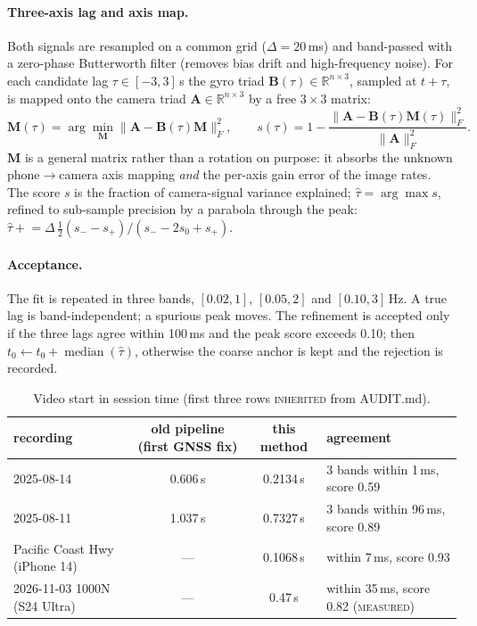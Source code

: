 \documentclass[10pt,a4paper]{article}
\newcommand{\meas}{\textsc{measured}}
\newcommand{\inh}{\textsc{inherited}}
\newcommand{\R}{\mathbb{R}}
\begin{document}
\paragraph{Three-axis lag and axis map.} Both signals are resampled on a common grid ($\Delta = 20$\,ms) and
band-passed with a zero-phase Butterworth filter (removes bias drift and high-frequency noise). For each
candidate lag $\tau \in [-3, 3]$\,s the gyro triad $\mathbf{B}(\tau) \in \R^{n\times3}$, sampled at
$t+\tau$, is mapped onto the camera triad $\mathbf{A} \in \R^{n\times3}$ by a free $3\times3$ matrix:
\begin{equation}
\mathbf{M}(\tau) = \arg\min_{\mathbf{M}} \|\mathbf{A} - \mathbf{B}(\tau)\mathbf{M}\|_F^2, \qquad
s(\tau) = 1 - \frac{\|\mathbf{A} - \mathbf{B}(\tau)\mathbf{M}(\tau)\|_F^2}{\|\mathbf{A}\|_F^2}.
\end{equation}
$\mathbf{M}$ is a general matrix rather than a rotation on purpose: it absorbs the unknown phone$\to$camera
axis mapping \emph{and} the per-axis gain error of the image rates. The score $s$ is the fraction of
camera-signal variance explained; $\hat\tau = \arg\max s$, refined to sub-sample precision by a parabola
through the peak: $\hat\tau \mathrel{+}= \Delta\,\tfrac12 (s_{-} - s_{+})/(s_{-} - 2s_0 + s_{+})$.

\paragraph{Acceptance.} The fit is repeated in three bands, $[0.02,1]$, $[0.05,2]$ and $[0.10,3]$\,Hz. A true
lag is band-independent; a spurious peak moves. The refinement is accepted only if the three lags agree
within 100\,ms and the peak score exceeds 0.10; then $t_0 \leftarrow t_0 + \operatorname{median}(\hat\tau)$,
otherwise the coarse anchor is kept and the rejection is recorded.

\begin{table}[H]
\centering\small
\begin{tabular}{@{}lccl@{}}
\toprule
recording & old pipeline (first GNSS fix) & this method & agreement \\
\midrule
2025-08-14 & 0.606\,s & 0.2134\,s & 3 bands within 1\,ms, score 0.59 \\
2025-08-11 & 1.037\,s & 0.7327\,s & 3 bands within 96\,ms, score 0.89 \\
Pacific Coast Hwy (iPhone 14) & --- & 0.1068\,s & within 7\,ms, score 0.93 \\
2026-11-03 1000N (S24 Ultra) & --- & 0.47\,s & within 35\,ms, score 0.82 (\meas) \\
\bottomrule
\end{tabular}
\caption{Video start in session time (first three rows \inh{} from AUDIT.md).}
\end{table}
\end{document}
